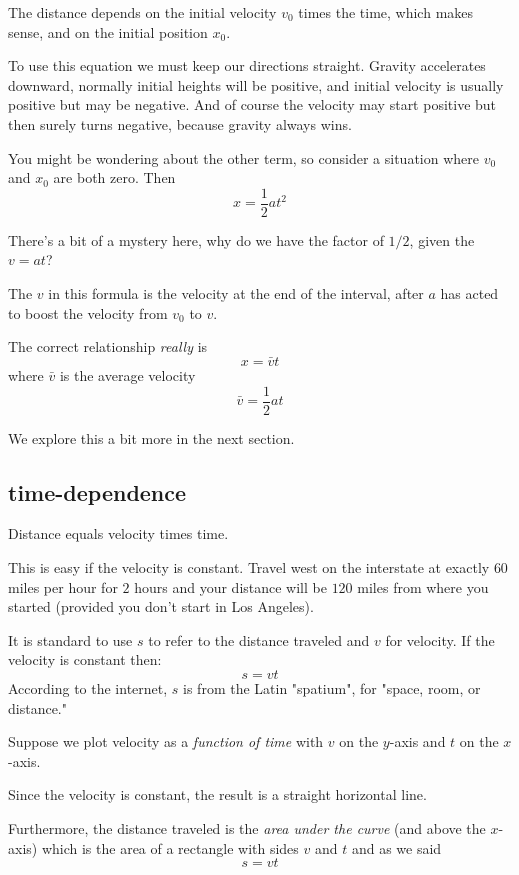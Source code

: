 \documentclass[11pt, oneside]{article}
\begin{document}
The distance depends on the initial velocity $v_0$ times the time, which makes sense, and on the initial position $x_0$.

To use this equation we must keep our directions straight.  Gravity accelerates downward, normally initial heights will be positive, and initial velocity is usually positive but may be negative.  And of course the velocity may start positive but then surely turns negative, because gravity always wins.

You might be wondering about the other term, so consider a situation where $v_0$ and $x_0$ are both zero.  Then
\[ x = \frac{1}{2}at^2 \]

There's a bit of a mystery here, why do we have the factor of $1/2$, given the $v = at$?  

The $v$ in this formula is the velocity at the end of the interval, after $a$ has acted to boost the velocity from $v_0$ to $v$.

The correct relationship \emph{really} is
\[ x = \bar{v} t \]
where $\bar{v}$ is the average velocity
\[ \bar{v} = \frac{1}{2}at \]

We explore this a bit more in the next section.

\subsection*{time-dependence}
Distance equals velocity times time.

This is easy if the velocity is constant.  Travel west on the interstate at exactly $60$ miles per hour for $2$ hours and your distance will be $120$ miles from where you started (provided you don't start in Los Angeles).  

It is standard to use $s$ to refer to the distance traveled and $v$ for velocity.  If the velocity is constant then:
\[ s = vt \]
According to the internet, $s$ is from the Latin "spatium", for "space, room, or distance."

Suppose we plot velocity as a \emph{function of time} with $v$ on the $y$-axis and $t$ on the $x$-axis.


Since the velocity is constant, the result is a straight horizontal line.  

Furthermore, the distance traveled is the \emph{area under the curve} (and above the $x$-axis) which is the area of a rectangle with sides $v$ and $t$ and as we said 
\[ s = vt \]
\end{document}
